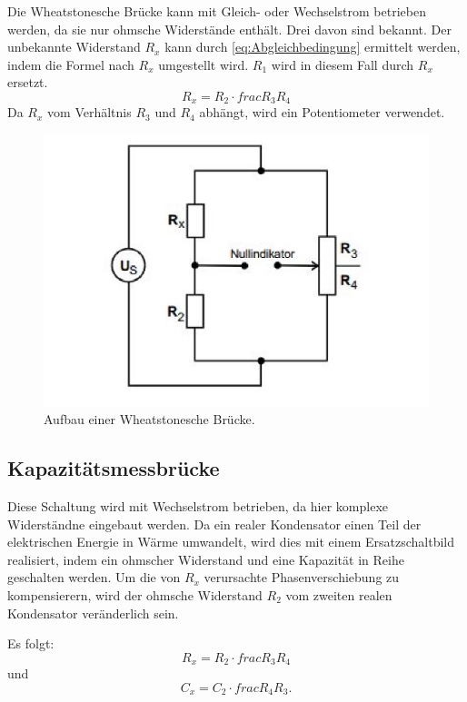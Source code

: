 Die Wheatstonesche Brücke kann mit Gleich- oder Wechselstrom betrieben werden, da sie nur ohmsche Widerstände enthält. 
Drei davon sind bekannt.
Der unbekannte Widerstand $R_x$ kann durch \eqref{eq:Abgleichbedingung} ermittelt werden, indem die Formel nach $R_x$ umgestellt wird.
$R_1$ wird in diesem Fall durch $R_x$ ersetzt.
\begin{equation}
    R_x = R_2 \cdot frac{R_3}{R_4}
\end{equation}
Da $R_x$ vom Verhältnis $R_3$ und $R_4$ abhängt, wird ein Potentiometer verwendet.

\begin{figure}
    \centering
    \includegraphics[width=\textwidth]{wheatBruecke.pdf}
    \caption{Aufbau einer Wheatstonesche Brücke.\cite{anleitung}}
\end{figure}

\subsection{Kapazitätsmessbrücke}
\label{sec:Kapazität}

Diese Schaltung wird mit Wechselstrom betrieben, da hier komplexe Widerständne eingebaut werden.
Da ein realer Kondensator einen Teil der elektrischen Energie in Wärme umwandelt, wird dies mit einem Ersatzschaltbild realisiert, indem ein ohmscher Widerstand und eine Kapazität in Reihe geschalten werden.
Um die von $R_x$ verursachte Phasenverschiebung zu kompensierern, wird der ohmsche Widerstand $R_2$ vom zweiten realen Kondensator veränderlich sein.

Es folgt:
\begin{equation}
    R_x = R_2 \cdot frac{R_3}{R_4}
\end{equation}
und
\begin{equation}
    C_x = C_2 \cdot frac{R_4}{R_3} .
\end{equation}

